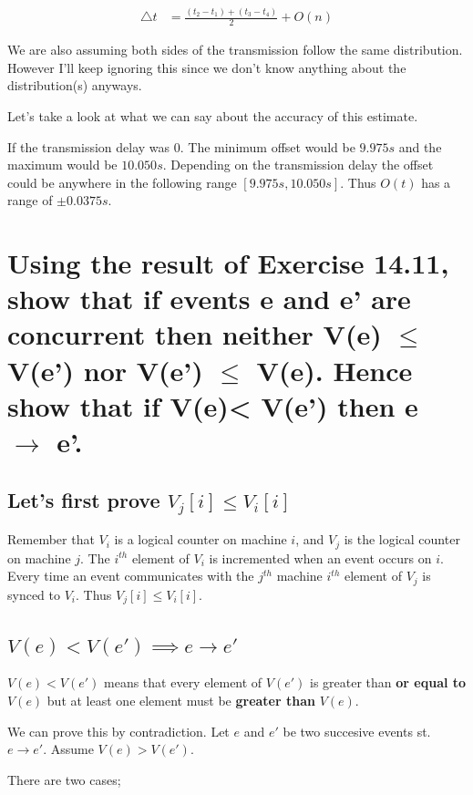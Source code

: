 \documentclass{article}
\begin{document}
\begin{equation}
    \begin{aligned}
        \triangle t &= \frac{(t_2 - t_1) + (t_3 - t_4)}{2} + O(n)
    \end{aligned}
\end{equation}

We are also assuming both sides of the transmission follow the same distribution. However I'll keep ignoring this since we don't
know anything about the distribution(s) anyways.

Let's take a look at what we can say about the accuracy of this estimate.

If the transmission delay was 0. The minimum offset would be $9.975s$ and the maximum would be $10.050s$. Depending on the transmission
delay the offset could be anywhere in the following range $[9.975s, 10.050s]$. Thus $O(t)$ has a range of $\pm 0.0375s$.

\section{Using the result of Exercise 14.11, show that if events e and e' are concurrent then
neither V(e) $\leq$ V(e') nor V(e') $\leq$ V(e). Hence show that if V(e)< V(e') then e $\rightarrow$ e'.}

\subsection{Let's first prove $V_j[i] \leq V_i[i]$}

Remember that $V_i$ is a logical counter on machine $i$, and $V_j$ is the logical counter on machine $j$.
The $i^{th}$ element of $V_i$ is incremented when an event occurs on $i$. Every time an event communicates with the $j^{th}$ machine
$i^{th}$ element of $V_j$ is synced to $V_i$. Thus $V_j[i] \leq V_i[i]$.

\subsection{$V(e) < V(e') \implies e \rightarrow e'$}

$V(e) < V(e')$ means that every element of $V(e')$ is greater than \textbf{or equal to} $V(e)$ but at least one
element must be \textbf{greater than} $V(e)$.

We can prove this by contradiction. Let $e$ and $e'$ be two succesive events st. $e \rightarrow e'$.
Assume $V(e) > V(e')$.

There are two cases;
\end{document}
